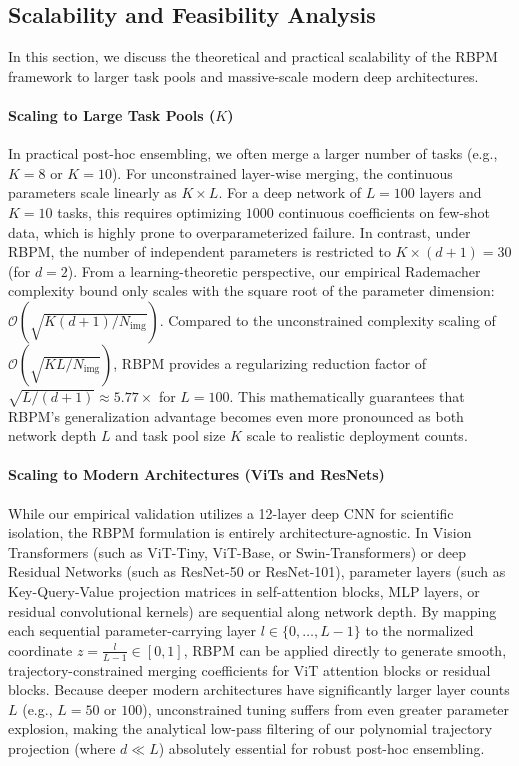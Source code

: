 \subsection{Scalability and Feasibility Analysis}
\label{subsec:scalability}

In this section, we discuss the theoretical and practical scalability of the RBPM framework to larger task pools and massive-scale modern deep architectures.

\paragraph{Scaling to Large Task Pools ($K$)}
In practical post-hoc ensembling, we often merge a larger number of tasks (e.g., $K = 8$ or $K = 10$). For unconstrained layer-wise merging, the continuous parameters scale linearly as $K \times L$. For a deep network of $L = 100$ layers and $K = 10$ tasks, this requires optimizing $1000$ continuous coefficients on few-shot data, which is highly prone to overparameterized failure. In contrast, under RBPM, the number of independent parameters is restricted to $K \times (d+1) = 30$ (for $d=2$).
From a learning-theoretic perspective, our empirical Rademacher complexity bound only scales with the square root of the parameter dimension: $\mathcal{O}(\sqrt{K(d+1)/N_{\text{img}}})$. Compared to the unconstrained complexity scaling of $\mathcal{O}(\sqrt{K L/N_{\text{img}}})$, RBPM provides a regularizing reduction factor of $\sqrt{L / (d+1)} \approx 5.77\times$ for $L=100$. This mathematically guarantees that RBPM's generalization advantage becomes even more pronounced as both network depth $L$ and task pool size $K$ scale to realistic deployment counts.

\paragraph{Scaling to Modern Architectures (ViTs and ResNets)}
While our empirical validation utilizes a 12-layer deep CNN for scientific isolation, the RBPM formulation is entirely architecture-agnostic. 
In Vision Transformers (such as ViT-Tiny, ViT-Base, or Swin-Transformers) or deep Residual Networks (such as ResNet-50 or ResNet-101), parameter layers (such as Key-Query-Value projection matrices in self-attention blocks, MLP layers, or residual convolutional kernels) are sequential along network depth. By mapping each sequential parameter-carrying layer $l \in \{0, \dots, L-1\}$ to the normalized coordinate $z = \frac{l}{L-1} \in [0, 1]$, RBPM can be applied directly to generate smooth, trajectory-constrained merging coefficients for ViT attention blocks or residual blocks. 
Because deeper modern architectures have significantly larger layer counts $L$ (e.g., $L = 50$ or $100$), unconstrained tuning suffers from even greater parameter explosion, making the analytical low-pass filtering of our polynomial trajectory projection (where $d \ll L$) absolutely essential for robust post-hoc ensembling.

